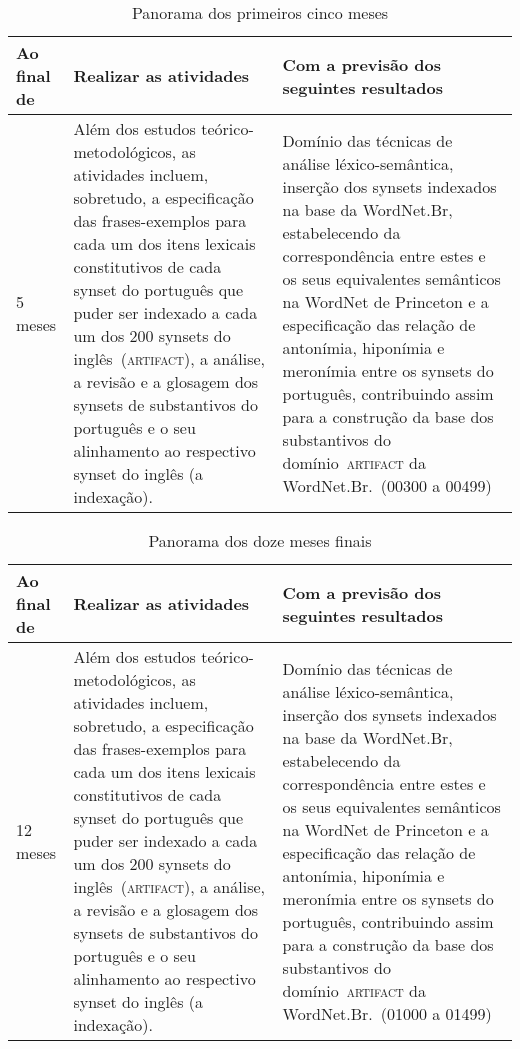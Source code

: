 \begin{table}[!h]\footnotesize
  \centering
  \begin{tabularx}{\linewidth}{ l X X } 
    \toprule
    \textbf{Ao final de} & \textbf{Realizar as atividades} & \textbf{Com a previsão dos seguintes resultados} \\
    \midrule
    5 meses & Além dos estudos teórico-metodológicos, as atividades incluem,
sobretudo, a especificação das frases-exemplos para cada um dos itens lexicais
constitutivos de cada synset do português que puder ser indexado a cada um dos
200 synsets do inglês~(\textsc{artifact}), a análise, a revisão e a glosagem
dos synsets de substantivos do português e o seu alinhamento ao respectivo
synset do inglês (a indexação). & Domínio das técnicas de análise
léxico-semântica, inserção dos synsets indexados na base da WordNet.Br,
estabelecendo da correspondência entre estes e os seus equivalentes semânticos
na WordNet de Princeton e a especificação das relação de antonímia, hiponímia e
meronímia entre os synsets do português, contribuindo assim para a construção
da base dos substantivos do domínio~\textsc{artifact} da WordNet.Br.~(00300 a
00499) \\
    \bottomrule
  \end{tabularx}
  \caption{Panorama dos primeiros cinco meses}
  \label{panorama0}
\end{table}

\begin{table}[!h]\footnotesize
  \centering
  \begin{tabularx}{\linewidth}{ l X X } 
    \toprule
    \textbf{Ao final de} & \textbf{Realizar as atividades} & \textbf{Com a previsão dos seguintes resultados} \\
    \midrule
    12 meses & Além dos estudos teórico-metodológicos, as atividades incluem,
sobretudo, a especificação das frases-exemplos para cada um dos itens lexicais
constitutivos de cada synset do português que puder ser indexado a cada um dos
200 synsets do inglês~(\textsc{artifact}), a análise, a revisão e a glosagem
dos synsets de substantivos do português e o seu alinhamento ao respectivo
synset do inglês (a indexação). & Domínio das técnicas de análise
léxico-semântica, inserção dos synsets indexados na base da WordNet.Br,
estabelecendo da correspondência entre estes e os seus equivalentes semânticos
na WordNet de Princeton e a especificação das relação de antonímia, hiponímia e
meronímia entre os synsets do português, contribuindo assim para a construção
da base dos substantivos do domínio~\textsc{artifact} da WordNet.Br.~(01000 a
01499) \\
    \bottomrule
  \end{tabularx}
  \caption{Panorama dos doze meses finais}
  \label{panorama1}
\end{table}

